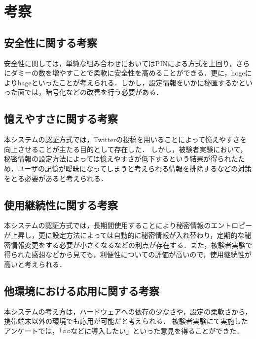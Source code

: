 \chapter{考察}\label{chap:discussion}

\section{安全性に関する考察}\label{sec:safety}
安全性に関しては，単純な組み合わせにおいてはPINによる方式を上回り，さらにダミーの数を増やすことで柔軟に安全性を高めることができる．更に，hogeによりhageといったことが考えられる．しかし，設定情報をいかに秘匿するかといった面では，暗号化などの改善を行う必要がある．

\section{憶えやすさに関する考察}\label{sec:memorable}
本システムの認証方式では，Twitterの投稿を用いることによって憶えやすさを向上させることが主たる目的として存在した．
しかし，被験者実験において，秘密情報の設定方法によっては憶えやすさが低下するという結果が得られたため，ユーザの記憶が曖昧になってしまうと考えられる情報を排除するなどの対策をとる必要があると考えられる．

\section{使用継続性に関する考察}\label{sec:continuity}
本システムの認証方式では，長期間使用することにより秘密情報のエントロピーが上昇し，更に設定方法によっては自動的に秘密情報が入れ替わり，定期的な秘密情報変更をする必要が小さくなるなどの利点が存在する．また，被験者実験で得られた感想などから見ても，利便性についての評価が高いので，使用継続性が高いと考えられる．

\section{他環境における応用に関する考察}\label{sec:application}
本システムの考え方は，ハードウェアへの依存の少なさや，設定の柔軟さから，携帯端末以外の環境でも応用が可能だと考えられる．
被験者実験にて実施したアンケートでは，「○○などに導入したい」といった意見を得ることができた．

\newpage

